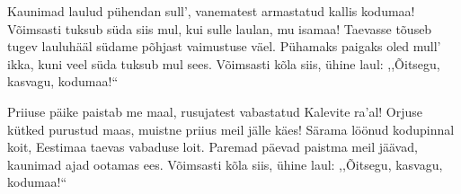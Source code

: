 Kaunimad laulud p\"uhendan sull',
vanematest armastatud kallis kodumaa!
V\~oimsasti tuksub s\"uda siis mul,
kui sulle laulan, mu isamaa!
Taevasse t\~ouseb tugev lauluh\"a\"al
s\"udame p\~ohjast vaimustuse v\"ael.
P\"uhamaks paigaks oled mull' ikka,
kuni veel s\"uda tuksub mul sees.
V\~oimsasti k\~ola siis, \"uhine laul:
,,\~Oitsegu, kasvagu, kodumaa!{``}

Priiuse p\"aike paistab me maal,
rusujatest vabastatud Kalevite ra'al!
Orjuse k\"utked purustud maas,
muistne priius meil j\"alle k\"aes!
S\"arama l\"o\"onud kodupinnal koit,
Eestimaa taevas vabaduse loit.
Paremad p\"aevad paistma meil j\"a\"avad,
kaunimad ajad ootamas ees.
V\~oimsasti k\~ola siis, \"uhine laul:
,,\~Oitsegu, kasvagu, kodumaa!{``}